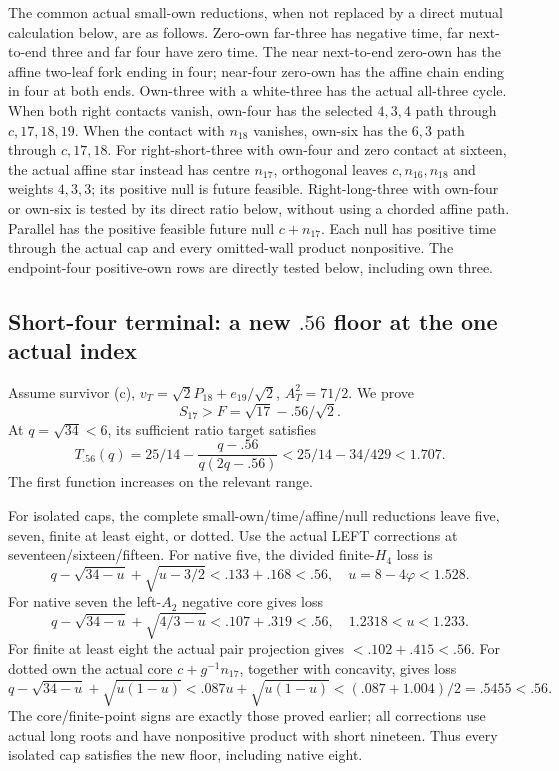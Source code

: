 \documentclass[11pt]{article}
\theoremstyle{definition}
\theoremstyle{remark}
\begin{document}
The common actual small-own
reductions, when not replaced by
a direct mutual calculation below,
are as follows.
Zero-own far-three has negative
time, far next-to-end three and
far four have zero time.
The near next-to-end zero-own
has the affine two-leaf fork
ending in four; near-four
zero-own has the affine chain
ending in four at both ends.
Own-three with a white-three
has the actual all-three cycle.
When both right contacts vanish, own-four has the selected
\(4,3,4\) path through \(c,17,18,19\).
When the contact with \(n_{18}\) vanishes, own-six has the
\(6,3\) path through \(c,17,18\).
For right-short-three with own-four and zero contact at sixteen,
the actual affine star instead has centre \(n_{17}\), orthogonal
leaves \(c,n_{16},n_{18}\)
and weights \(4,3,3\); its positive null is future feasible.
Right-long-three with own-four or own-six is tested by its direct
ratio below, without using a chorded affine path.
Parallel has the positive feasible future null \(c+n_{17}\).
Each null has positive time
through the actual cap and every
omitted-wall product nonpositive.
The endpoint-four positive-own
rows are directly tested below,
including own three.

\subsection[Short-four terminal: a new .56 floor at the one actual index]{Short-four terminal: a new \(.56\) floor at the one actual index}
\label{app:exact19:Bshortfourfloor}

Assume survivor (c),
\(v_T=\sqrt2P_{18}+e_{19}/\sqrt2\),
\(A_T^2=71/2\).
We prove
\[
                        S_{17}>F=\sqrt{17}-.56/\sqrt2 .
\tag{B19F56}\label{app:exact19:eq:BF56}
\]
At \(q=\sqrt{34}<6\), its sufficient
ratio target satisfies
\[
 T_{.56}(q)=25/14-\frac{q-.56}{q(2q-.56)}
                      <25/14-34/429<1.707 .
\]
The first function increases on
the relevant range.

For isolated caps, the complete
small-own/time/affine/null
reductions leave five, seven,
finite at least eight, or dotted.
Use the actual LEFT corrections
at seventeen/sixteen/fifteen.
For native five, the divided
finite-\(H_4\) loss is
\[
 q-\sqrt{34-u}+\sqrt{u-3/2}<.133+.168<.56,
                     \quad u=8-4\varphi<1.528 .
\]
For native seven the left-\(A_2\)
negative core gives loss
\[
 q-\sqrt{34-u}+\sqrt{4/3-u}<.107+.319<.56,
                         \quad1.2318<u<1.233 .
\]
For finite at least eight the
actual pair projection gives
\(<.102+.415<.56\).
For dotted own the actual core
\(c+g^{-1}n_{17}\), together with
concavity, gives loss
\[
 q-\sqrt{34-u}+\sqrt{u(1-u)}
  <.087u+\sqrt{u(1-u)}
  <(.087+1.004)/2=.5455<.56 .
\]
The core/finite-point signs are
exactly those proved earlier;
all corrections use actual long
roots and have nonpositive
product with short nineteen.
Thus every isolated cap satisfies
the new floor, including native
eight.
\end{document}
